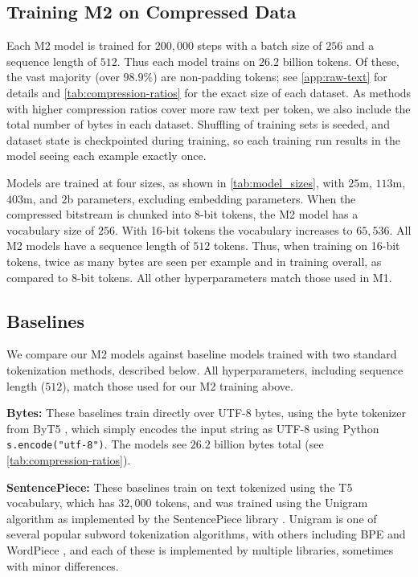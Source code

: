 \subsection{Training M2 on Compressed Data}

Each M2 model is trained for $200{,}000$ steps with a batch size of $256$ and a sequence length of $512$. Thus each model trains on $26.2$ billion tokens. Of these, the vast majority (over $98.9$\%) are non-padding tokens; see \ref{app:raw-text} for details and \ref{tab:compression-ratios} for the exact size of each dataset. As methods with higher compression ratios cover more raw text per token, we also include the total number of bytes in each dataset. Shuffling of training sets is seeded, and dataset state is checkpointed during training, so each training run results in the model seeing each example exactly once.

Models are trained at four sizes, as shown in \ref{tab:model_sizes}, with $25$m, $113$m, $403$m, and $2$b parameters, excluding embedding parameters. When the compressed bitstream is chunked into 8-bit tokens, the M2 model has a vocabulary size of $256$. With 16-bit tokens the vocabulary increases to $65{,}536$. All M2 models have a sequence length of $512$ tokens. Thus, when training on 16-bit tokens, twice as many bytes are seen per example and in training overall, as compared to 8-bit tokens. All other hyperparameters match those used in M1.

\subsection{Baselines}

We compare our M2 models against baseline models trained with two standard tokenization methods, described below. All hyperparameters, including sequence length ($512$), match those used for our M2 training above.

\textbf{Bytes:} These baselines train directly over UTF-8 bytes, using the byte tokenizer from ByT5 \cite{xue-etal-2022-byt5}, which simply encodes the input string as UTF-8 using Python \texttt{s.encode("utf-8")}. The models see $26.2$ billion bytes total (see \ref{tab:compression-ratios}).

\textbf{SentencePiece:} These baselines train on text tokenized using the T5 \cite{CRaffel20} vocabulary, which has $32{,}000$ tokens, and was trained using the Unigram algorithm \cite{kudo-2018-subword} as implemented by the SentencePiece library \cite{kudo-richardson-2018-sentencepiece}. Unigram is one of several popular subword tokenization algorithms, with others including BPE \cite{sennrich-etal-2016-neural} and WordPiece \cite{schusterJapaneseKoreanVoice2012,wu2016googlesneuralmachinetranslation}, and each of these is implemented by multiple libraries, sometimes with minor differences.

